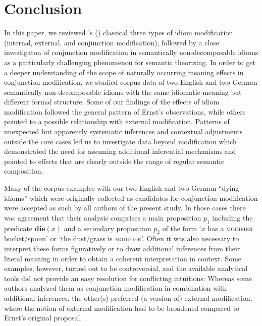 \documentclass[output=paper]{langsci/langscibook}
\begin{document}
\section{Conclusion} \label{Conclusion} 
In this paper, we reviewed \citeauthor{ernst81}'s (\citeyear{ernst81}) classical three types of idiom modification (internal, external, and conjunction modification), followed by a close investigaton of conjunction modification in semantically non-decomposable idioms as a particularly challenging phenomenon for semantic theorizing. In order to get a deeper understanding of the scope of naturally occurring meaning effects in conjunction modification, we studied corpus data of two English and two German semantically non-decomposable idioms with the same idiomatic meaning but different formal structure. Some of our findings of the effects of idiom modification followed the general pattern of Ernst's observations, while others pointed to a possible relationship with external modification. Patterns of unexpected but apparently systematic inferences and contextual adjustments outside the core cases led us to investigate data beyond modification which demonstrated the need for assuming additional inferential mechanisms and pointed to effects that are clearly outside the range of regular semantic composition.

Many of the corpus examples with our two English and two German ``dying idioms'' which were originally collected as candidates for conjunction modification were accepted as such by all authors of the present study. In those cases there was agreement that their analysis comprises a main proposition $p_{1}$ including the predicate $\textbf{die}(x)$ and a secondary proposition $p_{2}$ of the form `$x$ has a \textsc{modifier} bucket/spoon' or `the dust/grass is \textsc{modifier}'. Often it was also necessary to interpret these forms figuratively or to draw additional inferences from their literal meaning in order to obtain a coherent interpretation in context. Some examples, however, turned out to be controversial, and the available analytical tools did not provide an easy resolution for conflicting intuitions: Whereas some authors analyzed them as conjunction modification in combination with additional inferences, the other(s) preferred (a version of) external modification, where the notion of external modification had to be broadened compared to Ernst's original proposal.
\end{document}
